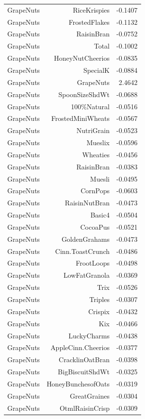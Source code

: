 \begin{longtable}{@{}lrr@{}}
GrapeNuts & RiceKrispies & -0.1407 \\
GrapeNuts & FrostedFlakes & -0.1132 \\
GrapeNuts & RaisinBran & -0.0752 \\
GrapeNuts & Total & -0.1002 \\
GrapeNuts & HoneyNutCheerios & -0.0835 \\
GrapeNuts & SpecialK & -0.0884 \\
GrapeNuts & GrapeNuts & 2.4642 \\
GrapeNuts & SpoonSizeShdWt & -0.0688 \\
GrapeNuts & 100\%Natural & -0.0516 \\
GrapeNuts & FrostedMiniWheats & -0.0567 \\
GrapeNuts & NutriGrain & -0.0523 \\
GrapeNuts & Mueslix & -0.0596 \\
GrapeNuts & Wheaties & -0.0456 \\
GrapeNuts & RaisinBran & -0.0383 \\
GrapeNuts & Muesli & -0.0495 \\
GrapeNuts & CornPops & -0.0603 \\
GrapeNuts & RaisinNutBran & -0.0473 \\
GrapeNuts & Basic4 & -0.0504 \\
GrapeNuts & CocoaPus & -0.0521 \\
GrapeNuts & GoldenGrahams & -0.0473 \\
GrapeNuts & Cinn.ToastCrunch & -0.0486 \\
GrapeNuts & FrootLoops & -0.0498 \\
GrapeNuts & LowFatGranola & -0.0369 \\
GrapeNuts & Trix & -0.0526 \\
GrapeNuts & Triples & -0.0307 \\
GrapeNuts & Crispix & -0.0432 \\
GrapeNuts & Kix & -0.0466 \\
GrapeNuts & LuckyCharms & -0.0438 \\
GrapeNuts & AppleCinn.Cheerios & -0.0377 \\
GrapeNuts & CracklinOatBran & -0.0398 \\
GrapeNuts & BigBiscuitShdWt & -0.0325 \\
GrapeNuts & HoneyBunchesofOats & -0.0319 \\
GrapeNuts & GreatGraines & -0.0304 \\
GrapeNuts & OtmlRaisinCrisp & -0.0309 \\

\end{longtable}
